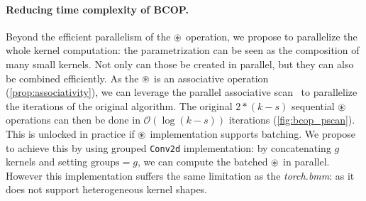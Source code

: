     
    

\vspace{-1mm}\paragraph{Reducing time complexity of BCOP.}

    Beyond the efficient parallelism of the $\circledast$ operation, we propose to parallelize the whole kernel computation: the parametrization can be seen as the composition of many small kernels. Not only can those be created in parallel, but they can also be combined efficiently. As the $\circledast$ is an associative operation (\cref{prop:associativity}), we can leverage the parallel associative scan~\cite{zouzias2023parallel, daniel1986data} to parallelize the iterations of the original algorithm. The original $2*(k-s)$ sequential $\circledast$ operations can then be done in  $\mathcal{O} (\log (k-s)) $ iterations (\cref{fig:bcop_pscan}). This is unlocked in practice if $\circledast$ implementation supports batching. %
    We propose to achieve this by using grouped \texttt{Conv2d} implementation: by concatenating $g$ kernels and setting $\text{groups}=g$, we can compute the batched $\circledast$ in parallel.
    However this implementation suffers the same limitation as the \textit{torch.bmm}: as it does not support heterogeneous kernel shapes.

